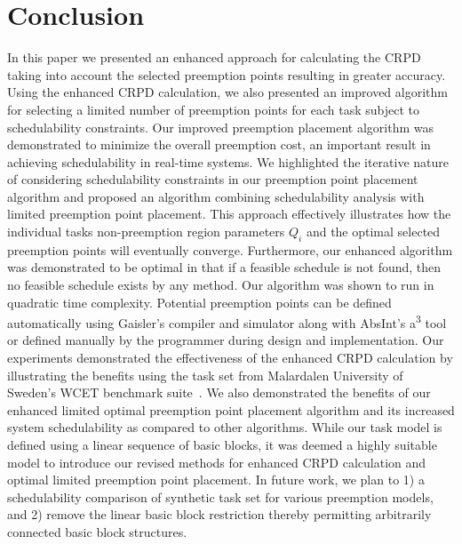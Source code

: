 \section{Conclusion}\label{sec:conclusion}

In this paper we presented an enhanced approach for calculating the
CRPD taking into account the selected preemption points resulting
in greater accuracy.  Using the enhanced CRPD calculation, we also
presented an improved algorithm for selecting a limited number of
preemption points for each task subject to schedulability constraints.
Our improved preemption placement algorithm was demonstrated to
minimize the overall preemption cost, an important result in achieving
schedulability in real-time systems.  We highlighted the iterative nature
of considering schedulability constraints in our preemption point
placement algorithm and proposed an algorithm combining schedulability
analysis with limited preemption point placement.  This approach
effectively illustrates how the individual tasks non-preemption
region parameters $Q_i$ and the optimal selected preemption points will
eventually converge.  Furthermore, our enhanced algorithm was demonstrated to be
optimal in that if a feasible schedule is not found, then no feasible
schedule exists by any method.  Our algorithm was shown to run in quadratic time
complexity.  Potential preemption points can be defined automatically
using Gaisler's compiler and simulator along with AbsInt's
a\textsuperscript{3} tool or defined manually by the programmer during design
and implementation. Our experiments demonstrated the effectiveness of
the enhanced CRPD calculation by illustrating the benefits using the
task set from Malardalen University of Sweden's WCET benchmark suite~\cite{mrtc:01}.
We also demonstrated the benefits of our enhanced limited optimal preemption
point placement algorithm and its increased system schedulability as
compared to other algorithms.  While our task model is defined using a linear
sequence of basic blocks, it was deemed a highly suitable model to introduce
our revised methods for enhanced CRPD calculation and optimal limited
preemption point placement.  In future work, we plan to 1) a schedulability comparison
of synthetic task set for various preemption models, and 2) remove the linear
basic block restriction thereby permitting arbitrarily connected basic
block structures.
